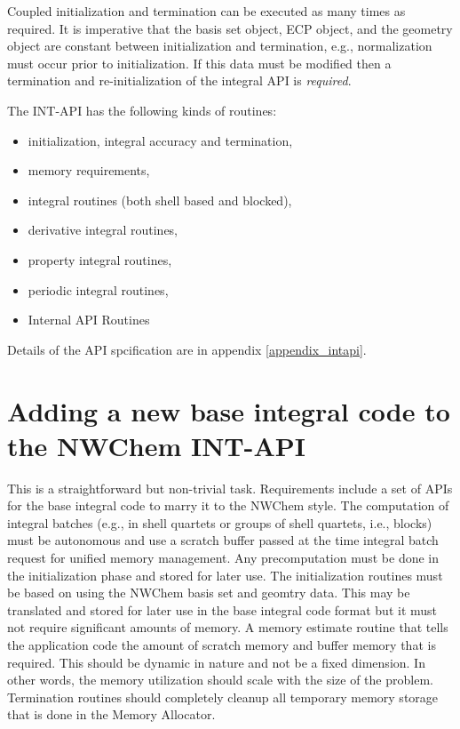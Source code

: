 Coupled initialization and termination can be executed as many times 
as required. It is imperative that the basis set object, ECP object, 
and the geometry object are constant between initialization and 
termination, e.g., normalization must occur prior to initialization. 
If this data must be modified then a termination and re-initialization 
of the integral API is {\it required}. 
 
The INT-API has the following kinds of routines: 
\begin{itemize} 
\item initialization, integral accuracy and termination, 
\item memory requirements, 
\item integral routines (both shell based and blocked), 
\item derivative integral routines, 
\item property integral routines, 
\item periodic integral routines, 
\item Internal API Routines 
\end{itemize} 
 
Details of the API spcification are in appendix \ref{appendix_intapi}. 
 
\section{Adding a new base integral code to the NWChem INT-API} 
 
This is a straightforward but non-trivial task.  Requirements include 
a set of APIs for the base integral code to marry it to the NWChem 
style.  The computation of integral batches (e.g., in shell quartets 
or groups of shell quartets, i.e., blocks) must be autonomous and use 
a scratch buffer passed at the time integral batch request for unified 
memory management.  Any precomputation must be done in the 
initialization phase and stored for later use.  The initialization 
routines must be based on using the NWChem basis set and geomtry data. 
This may be translated and stored for later use in the base integral 
code format but it must not require significant amounts of memory.  A 
memory estimate routine that tells the application code the amount of 
scratch memory and buffer memory that is required.  This should be 
dynamic in nature and not be a fixed dimension.  In other words, the 
memory utilization should scale with the size of the problem. 
Termination routines should completely cleanup all temporary memory 
storage that is done in the Memory Allocator.   
 
